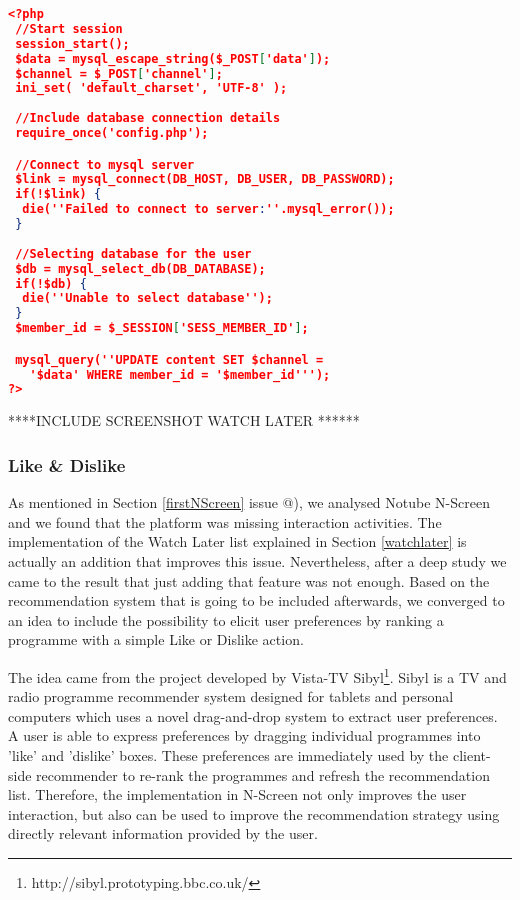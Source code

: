 \documentclass{acm_proc_article-sp}
\makeatletter
\newcommand*{\rom}[1]{\expandafter\@slowromancap\romannumeral #1@}
\makeatother
\begin{document}
\begin{lstlisting}[language=json,firstnumber=1]
<?php
 //Start session
 session_start();
 $data = mysql_escape_string($_POST['data']);
 $channel = $_POST['channel'];
 ini_set( 'default_charset', 'UTF-8' );
	
 //Include database connection details
 require_once('config.php');

 //Connect to mysql server
 $link = mysql_connect(DB_HOST, DB_USER, DB_PASSWORD);
 if(!$link) {
  die(''Failed to connect to server:''.mysql_error());
 }
	
 //Selecting database for the user
 $db = mysql_select_db(DB_DATABASE);
 if(!$db) {
  die(''Unable to select database'');
 }
 $member_id = $_SESSION['SESS_MEMBER_ID'];

 mysql_query(''UPDATE content SET $channel = 
   '$data' WHERE member_id = '$member_id''');
?>
\end{lstlisting}

****INCLUDE SCREENSHOT WATCH LATER ******

\subsubsection{Like \& Dislike}
As mentioned in Section \ref{firstNScreen} issue \rom{3}), we analysed Notube N-Screen and we found that the platform was missing interaction activities. The implementation of the Watch Later list explained in Section \ref{watchlater} is  actually an addition that improves this issue. Nevertheless, after a deep study we came to the result that just adding that feature was not enough. Based on the recommendation system that is going to be included afterwards, we converged to an idea to include the possibility to elicit user preferences by ranking a programme with a simple Like or Dislike action. 

The idea came from the project developed by Vista-TV Sibyl\footnote{http://sibyl.prototyping.bbc.co.uk/}. Sibyl is a TV and radio programme recommender system designed for tablets and personal computers which uses a novel drag-and-drop system to extract user preferences. A user is able to express preferences by dragging individual programmes into 'like' and 'dislike' boxes. These preferences are immediately used by the client-side recommender to re-rank the programmes and refresh the recommendation list. Therefore, the implementation in N-Screen not only improves the user interaction, but also can be used to improve the recommendation strategy using directly relevant information provided by the user. 
\end{document}

